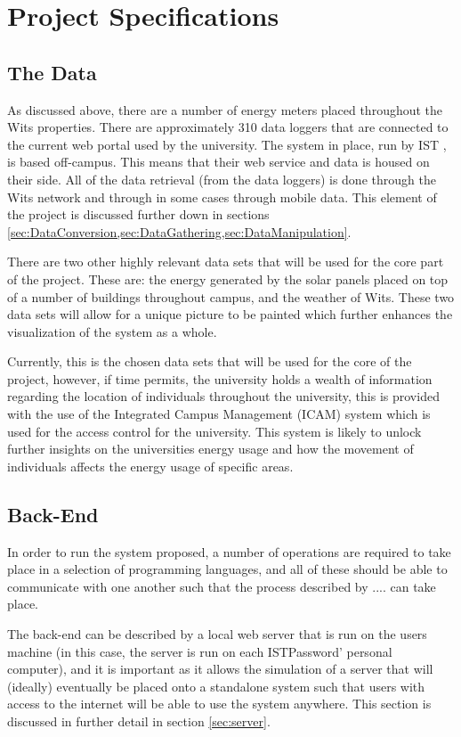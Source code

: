 \documentclass[12pt,onecolumn]{IEEEtran}
\begin{document}
\section{Project Specifications}

\subsection{The Data} \label{sec:TheData}
As discussed above, there are a number of energy meters placed throughout the Wits properties. There are approximately 310 data loggers that are connected to the current web portal used by the university. 
The system in place, run by IST \cite{IST}, is based off-campus. This means that their web service and data is housed on their side. All of the data retrieval (from the data loggers) is done through the Wits network and through in some cases through mobile data. This element of the project is discussed further down in sections \ref{sec:DataConversion,sec:DataGathering,sec:DataManipulation}. 

There are two other highly relevant data sets that will be used for the core part of the project. These are: the energy generated by the solar panels placed on top of a number of buildings throughout campus, and the weather of Wits. 
These two data sets will allow for a unique picture to be painted which further enhances the visualization of the system as a whole. 

Currently, this is the chosen data sets that will be used for the core of the project, however, if time permits, the university holds a wealth of information regarding the location of individuals throughout the university, this is provided with the use of the Integrated Campus Management (ICAM) system which is used for the access control for the university. 
This system is likely to unlock further insights on the universities energy usage and how the movement of individuals affects the energy usage of specific areas. 


\subsection{Back-End} \label{sec:BackEnd}
In order to run the system proposed, a number of operations are required to take place in a selection of programming languages, and all of these should be able to communicate with one another such that the process described by .... can take place. 

The back-end can be described by a local web server that is run on the users machine (in this case, the server is run on each ISTPassword' personal computer), and it is important as it allows the simulation of a server that will (ideally) eventually be placed onto a standalone system such that users with access to the internet will be able to use the system anywhere.
This section is discussed in further detail in section \ref{sec:server}.
\end{document}
